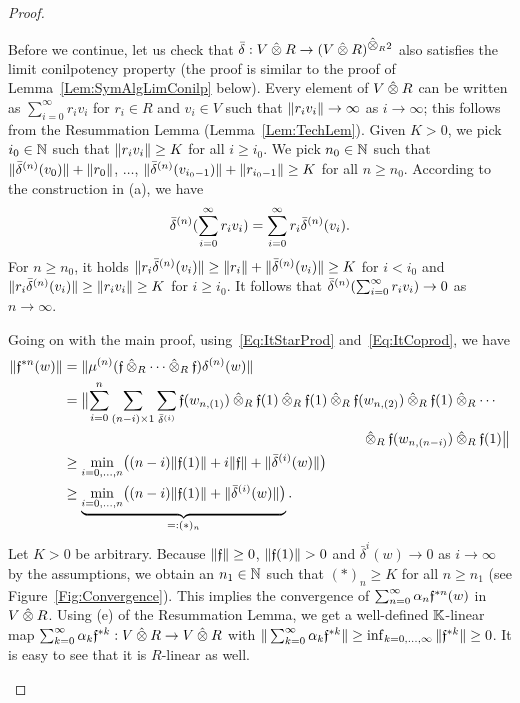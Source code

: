 \documentclass[\MainFolder/Text.tex]{subfiles}
\begin{document}
\begin{proof}
\begin{ProofList}
Before we continue, let us check that $\bar{\MVCoProd}: V\COtimes R \rightarrow (V\COtimes R)^{\COtimes_R 2}$ also satisfies the limit conilpotency property (the proof is similar to the proof of Lemma~\ref{Lem:SymAlgLimConilp} below). Every element of $V\COtimes R$ can be written as $\sum_{i=0}^\infty r_i v_i$ for $r_i\in R$ and $v_i\in V$ such that $\| r_i v_i \| \to \infty$ as $i\to \infty$; this follows from the Resummation Lemma (Lemma~\ref{Lem:TechLem}). Given $K>0$, we pick $i_0\in \mathbb{N}$ such that $\| r_iv_i \|\ge K$ for all $i\ge i_0$. We pick $n_0\in \mathbb{N}$ such that $\| \bar{\delta}^{(n)}(v_0) \|+\| r_0 \|$, $\dotsc$, $\| \bar{\delta}^{(n)}(v_{i_0-1}) \|+\| r_{i_0-1} \| \ge K$ for all $n\ge n_0$. According to the construction in (a), we have 
$$ \bar{\delta}^{(n)}(\sum_{i=0}^\infty r_i v_i) = \sum_{i=0}^\infty r_i \bar{\delta}^{(n)}(v_i). $$
For $n\ge n_0$, it holds $\| r_i\bar{\delta}^{(n)}(v_i) \|\ge \| r_i \| + \| \bar{\delta}^{(n)}(v_i) \|\ge K$ for $i<i_0$ and $\| r_i\bar{\delta}^{(n)}(v_i) \|\ge \| r_i v_i \| \ge K$ for $i\ge i_0$. It follows that $\bar{\delta}^{(n)}(\sum_{i=0}^\infty r_i v_i) \to 0$ as $n\to \infty$.


Going on with the main proof, using~\eqref{Eq:ItStarProd} and~\eqref{Eq:ItCoprod}, we have
\begin{align*}
\Norm{\MVMorF^{\Star n}(w)} & = \Norm{\mu^{(n)}(\MVMorF\COtimes_R \dotsb \COtimes_R \MVMorF)\delta^{(n)}(w)} \\
 & = \begin{multlined}[t] \bigl\|\sum_{i=0}^n \sum_{(n-i)\times 1} \sum_{\bar{\delta}^{(i)}} \MVMorF(w_{n,(1)})\COtimes_R \MVMorF(1)\COtimes_R \MVMorF(1) \COtimes_R \MVMorF(w_{n,(2)}) \COtimes_R \MVMorF(1)\COtimes_R \dotsb \\ \COtimes_R \MVMorF(w_{n,(n-i)})\COtimes_R \MVMorF(1)\bigr\| \end{multlined}\\
 & \ge \min_{i=0,\dotsc,n}\bigl( (n-i) \Norm{\MVMorF(1)} + i \Norm{\MVMorF} + \Norm{\bar{\delta}^{(i)}(w)} \bigr) \\
& \ge \underbrace{\min_{i=0,\dotsc,n}\bigl( (n-i) \Norm{\MVMorF(1)} + \Norm{\bar{\delta}^{(i)}(w)} \bigr)}_{=:(*)_n}.
\end{align*}
Let $K>0$ be arbitrary. Because $\| \mathfrak{f} \|\ge 0$, $\Norm{\MVMorF(1)}>0$ and $\bar{\delta}^{i}(w) \to 0$ as $i\to \infty$ by the assumptions, we obtain an $n_1\in \mathbb{N}$ such that $(*)_n\ge K$ for all $n \ge n_1$ (see Figure~\ref{Fig:Convergence}).
This implies the convergence of $\sum_{n=0}^\infty \alpha_n\mathfrak{f}^{* n}(w)$ in $V\COtimes R$. Using (e) of the Resummation Lemma, we get a well-defined $\mathbb{K}$-linear map $\sum_{k=0}^\infty \alpha_k \MVMorF^{\Star k}: V\COtimes R \rightarrow V\COtimes R$ with $\| \sum_{k=0}^\infty \alpha_k \mathfrak{f}^{* k} \| \ge \inf_{k=0,\dotsc,\infty} \| \mathfrak{f}^{* k} \| \ge  0$. It is easy to see that it is $R$-linear as well. \qedhere
\end{ProofList}
\end{proof}
\end{document}
